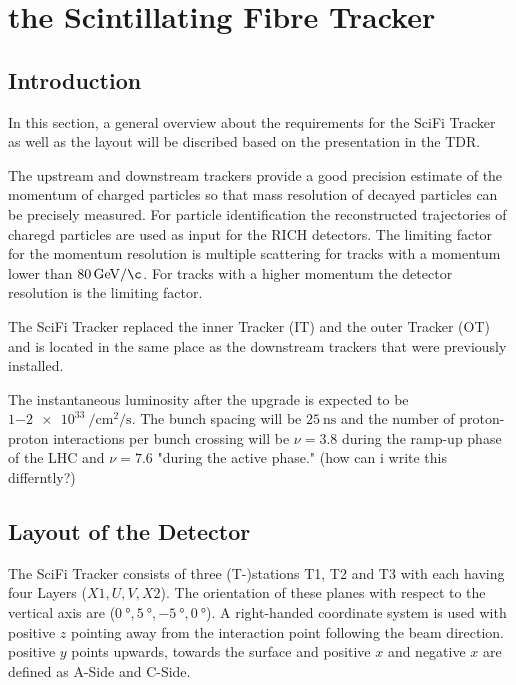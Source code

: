 \section{the Scintillating Fibre Tracker}
\label{sec:scifi}
\subsection{Introduction}

In this section, a general overview about the requirements for the SciFi Tracker as well as the layout will be discribed based on the presentation in the TDR\cite{scifiInfo}.

The upstream and downstream trackers provide a good precision estimate of the momentum of charged particles so that mass resolution of decayed particles can be precisely measured. %
For particle identification the reconstructed trajectories of charegd particles are used as input for the RICH detectors.
The limiting factor for the momentum resolution is multiple scattering for tracks with a momentum lower than $\SI{80}{\giga\electronvolt\per\c}$. For tracks with a higher momentum the detector resolution is the limiting factor.

The SciFi Tracker replaced the inner Tracker (IT) and the outer Tracker (OT) and is located in the same place as the downstream trackers that were previously installed.

The instantaneous luminosity after the upgrade is expected to be $\SI{1-2e33}{\per\centi\metre\squared\per\second}$. The bunch spacing will be $\SI{25}{\nano\second}$ and the number of proton-proton interactions per bunch crossing will be $\nu = 3.8$ during the ramp-up phase of the LHC and $\nu = 7.6$ "during the active phase." (how can i write this differntly?)

\subsection{Layout of the Detector}
The SciFi Tracker consists of three (T-)stations T1, T2 and T3 with each having four Layers ($X1, U, V, X2$). The orientation of these planes with respect to the vertical axis are ($\SI{0}{\degree}, \SI{+5}{\degree}, \SI{-5}{\degree}, \SI{0}{\degree}$).
A right-handed coordinate system is used with positive $z$ pointing away from the interaction point following the beam direction. positive $y$ points upwards, towards the surface and positive $x$ and negative $x$ are defined as A-Side and C-Side\cite{scifiInfo}.


